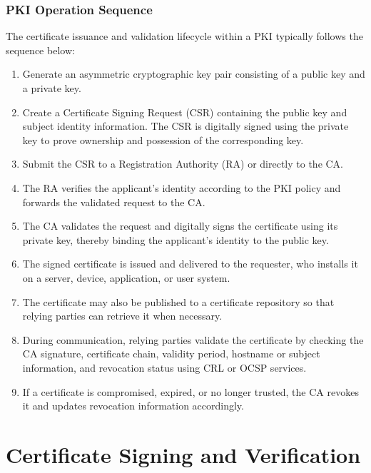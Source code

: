 \documentclass[10pt,twocolumn]{article}
\begin{document}
\subsubsection{PKI Operation Sequence}

The certificate issuance and validation lifecycle within a PKI typically
follows the sequence below:

\begin{enumerate}
  \item Generate an asymmetric cryptographic key pair consisting of a public
        key and a private key.
  \item Create a Certificate Signing Request (CSR) containing the public key
        and subject identity information. The CSR is digitally signed using the
        private key to prove ownership and possession of the corresponding key.
  \item Submit the CSR to a Registration Authority (RA) or directly to the CA.
  \item The RA verifies the applicant's identity according to the PKI policy
        and forwards the validated request to the CA.
  \item The CA validates the request and digitally signs the certificate using
        its private key, thereby binding the applicant's identity to the public
        key.
  \item The signed certificate is issued and delivered to the requester, who
        installs it on a server, device, application, or user system.
  \item The certificate may also be published to a certificate repository so
        that relying parties can retrieve it when necessary.
  \item During communication, relying parties validate the certificate by
        checking the CA signature, certificate chain, validity period,
        hostname or subject information, and revocation status using CRL or
        OCSP services.
  \item If a certificate is compromised, expired, or no longer trusted, the CA
        revokes it and updates revocation information accordingly.
\end{enumerate}

\section{Certificate Signing and Verification}
\end{document}
